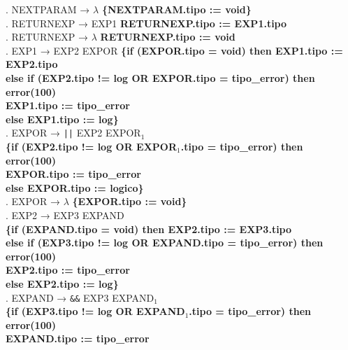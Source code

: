 \begin{tabbing}
    . NEXTPARAM → $\lambda$ \textbf{\{NEXTPARAM.tipo := void\}}\\
    . RETURNEXP → EXP1 \textbf{RETURNEXP.tipo := EXP1.tipo}\\
    . RETURNEXP → $\lambda$ \textbf{RETURNEXP.tipo := void}\\
    . EXP1 → EXP2 EXPOR \>\textbf{\{if (EXPOR.tipo = void) then EXP1.tipo := EXP2.tipo}\\
    \>                     \> \textbf{else if (EXP2.tipo != log OR EXPOR.tipo = tipo\_error) then}\\
    \>                     \> \> \textbf{error(100)}\\
    \>                     \> \> \textbf{EXP1.tipo := tipo\_error}\\
    \>                     \> \textbf{else EXP1.tipo := log\}}\\
    . EXPOR → \verb!||! EXP2 EXPOR$_1$\\
    \>                     \>\textbf{\{if (EXP2.tipo != log OR EXPOR$_1$.tipo = tipo\_error) then}\\
    \>                     \> \> \textbf{error(100)}\\
    \>                     \> \> \textbf{EXPOR.tipo := tipo\_error}\\
    \>                     \> \textbf{else EXPOR.tipo := logico\}}\\
    . EXPOR → $\lambda$ \textbf{\{EXPOR.tipo := void\}}\\
    . EXP2 → EXP3 EXPAND\\
    \>                     \>\textbf{\{if (EXPAND.tipo = void) then EXP2.tipo := EXP3.tipo}\\
    \>                     \> \textbf{else if (EXP3.tipo != log OR EXPAND.tipo = tipo\_error) then}\\
    \>                     \> \> \textbf{error(100)}\\
    \>                     \> \> \textbf{EXP2.tipo := tipo\_error}\\
    \>                     \> \textbf{else EXP2.tipo := log\}}\\
    . EXPAND → \verb!&&! EXP3 EXPAND$_1$\\
    \>                     \>\textbf{\{if (EXP3.tipo != log OR EXPAND$_1$.tipo = tipo\_error) then}\\
    \>                     \> \> \textbf{error(100)}\\
    \>                     \> \> \textbf{EXPAND.tipo := tipo\_error}\\

\end{tabbing}
